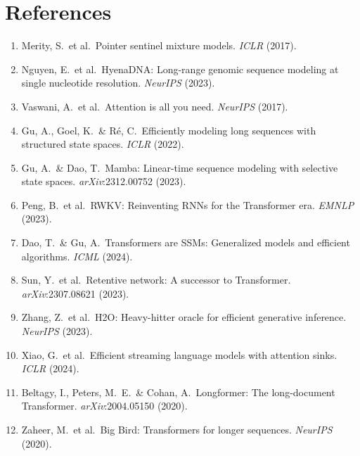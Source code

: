 \documentclass{article}
\begin{document}
\section*{References}

\begin{enumerate}\setlength{\itemsep}{1pt}\small

\item Merity, S.\ et al.\ Pointer sentinel mixture models.
      \textit{ICLR} (2017).

\item Nguyen, E.\ et al.\ HyenaDNA: Long-range genomic sequence modeling
      at single nucleotide resolution.
      \textit{NeurIPS} (2023).

\item Vaswani, A.\ et al.\ Attention is all you need.
      \textit{NeurIPS} (2017).

\item Gu, A., Goel, K.\ \& R\'{e}, C.\ Efficiently modeling long sequences
      with structured state spaces. \textit{ICLR} (2022).

\item Gu, A.\ \& Dao, T.\ Mamba: Linear-time sequence modeling with
      selective state spaces. \textit{arXiv}:2312.00752 (2023).

\item Peng, B.\ et al.\ RWKV: Reinventing RNNs for the Transformer era.
      \textit{EMNLP} (2023).

\item Dao, T.\ \& Gu, A.\ Transformers are SSMs: Generalized models and
      efficient algorithms. \textit{ICML} (2024).

\item Sun, Y.\ et al.\ Retentive network: A successor to Transformer.
      \textit{arXiv}:2307.08621 (2023).

\item Zhang, Z.\ et al.\ H2O: Heavy-hitter oracle for efficient
      generative inference. \textit{NeurIPS} (2023).

\item Xiao, G.\ et al.\ Efficient streaming language models with
      attention sinks. \textit{ICLR} (2024).

\item Beltagy, I., Peters, M.\ E.\ \& Cohan, A.\ Longformer: The
      long-document Transformer. \textit{arXiv}:2004.05150 (2020).

\item Zaheer, M.\ et al.\ Big Bird: Transformers for longer sequences.
      \textit{NeurIPS} (2020).


\end{enumerate}
\end{document}
